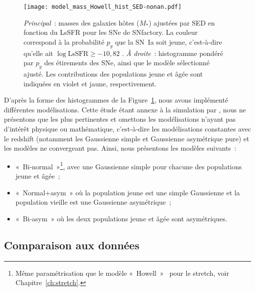\documentclass[../main/main.tex]{subfiles}
\begin{document}
\begin{figure}[t]
    \centering
    \texttt{[image: model\_mass\_Howell\_hist\_SED-nonan.pdf]}
    \caption[$M_*$ en fonction du LsSFR des SNe~Ia de SNfactory et modèle de
    masse sélectionné ajusté]{\textit{Principal}~: masses des galaxies hôtes
        ($M_*$) ajustées par SED en fonction du LsSFR pour les SNe de SNfactory.
        La couleur correspond à la probabilité $p_y$ que la SN~Ia soit jeune,
        c'est-à-dire qu'elle ait $\log \mathrm{LsSFR} \geq -10,82$
        \citep[voir][et Chapitre~\ref{ch:stretch}]{rigault2020}. \textit{À
        droite}~: histogramme pondéré par $p_y$ des étirements des SNe, ainsi
        que le modèle sélectionné ajusté. Les contributions des populations
    jeune et âgée sont indiquées en violet et jaune, respectivement.}
    \label{fig:massmodel}
\end{figure}

D'après la forme des histogrammes de la Figure~\ref{fig:massmodel}, nous avons
implémenté différentes modélisations. Cette étude étant annexe à la simulation
par \snana, nous ne présentons que les plus pertinentes et omettons les
modélisations n'ayant pas d'intérêt physique ou mathématique, c'est-à-dire les
modélisations constantes avec le redshift (notamment les Gaussienne simple et
Gaussienne asymétrique pure) et les modèles ne convergeant pas. Ainsi, nous
présentons les modèles suivants~:

\begin{itemize}
    \item «~Bi-normal~»\footnote{Même paramétrisation que le modèle
            «~Howell~»~\citep{howell2007} pour le stretch, voir
        Chapitre~\ref{ch:stretch}.}, avec une Gaussienne simple pour chacune des
        populations jeune et âgée~;

    \item «~Normal+asym~» où la population jeune est une simple Gaussienne et la
        population vieille est une Gaussienne asymétrique~;

    \item «~Bi-asym~» où les deux populations jeune et âgée sont asymétriques.
\end{itemize}

\subsection{Comparaison aux données}\label{ssec:mres}
\end{document}
